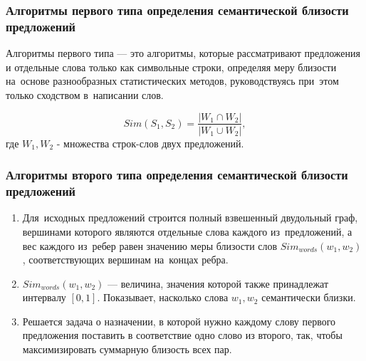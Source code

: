 \documentclass{beamer}
\begin{document}
\begin{frame}
\frametitle{Алгоритмы первого типа определения семантической близости предложений}

Алгоритмы первого типа --- это алгоритмы, которые рассматривают предложения и отдельные слова только как символьные строки, 
определяя меру близости на~основе разнообразных статистических методов, 
руководствуясь при~этом только сходством в~написании слов.

$$Sim(S_1,S_2) = \frac{|W_1\cap W_2|}{|W_1\cup W_2|},$$
где $W_1,W_2$ - множества строк-слов двух предложений.

\end{frame}

\begin{frame}
\frametitle{Алгоритмы второго типа определения семантической близости предложений}

\begin{enumerate}
\item{
Для~исходных предложений строится полный взвешенный двудольный граф, 
вершинами которого являются отдельные слова каждого из~предложений, 
а вес каждого из~ребер равен значению меры близости слов $Sim_{words}(w_1, w_2)$,
соответствующих вершинам на~концах ребра. 
}
\item{
$Sim_{words}(w_1, w_2)$ --- величина, значения которой также принадлежат интервалу $[0,1]$.
Показывает, насколько слова $w_1,w_2$ семантически близки.
}
\item{
Решается задача о назначении, в которой
нужно каждому слову первого предложения поставить в соответствие одно слово из второго,
так, чтобы максимизировать суммарную близость всех пар.
}
\end{enumerate}

\end{frame}
\end{document}
